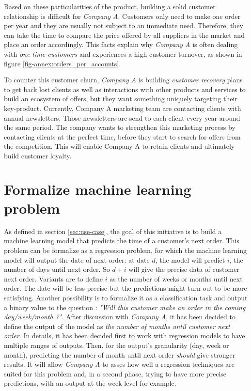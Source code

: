  Based on these particularities of the product, building a solid customer relationship is difficult for \textit{Company A}. Customers only need to make one order per year and they are usually not subject to an immediate need. Therefore, they can take the time to compare the price offered by all suppliers in the market and place an order accordingly. This facts explain why \textit{Company A} is often dealing with \textit{one-time customers} and experiences a high customer turnover, as shown in figure \ref{fig-annex:orders_per_accounts}.
 
 
 To counter this customer churn, \textit{Company A} is building \textit{customer recovery} plans to get back lost clients as well as interactions with other products and services to build an ecosystem of offers, but they want something uniquely targeting their key-product. Currently, Company A marketing team are contacting clients with annual newsletters. Those newsletters are send to each client every year around the same period. The company wants to strengthen this marketing process by contacting clients at the perfect time, before they start to search for offers from the competition. This will enable Company A to retain clients and ultimately build customer loyalty.
 
 
\section{Formalize machine learning problem} \label{sec:ml-metrics}

As defined in section \ref{sec:use-case}, the goal of this initiative is to build a machine learning model that predicts the time of a customer's next order. This problem can be formalize as a regression problem, for which the machine learning model will output the date of next order: at date $d$, the model will predict $i$, the number of days until next order. So $d+i$ will give the precise data of customer next order. Variants are to define $i$ as the number of weeks or months until next order. The date will be less precise but the predictions might turn out to be more satisfying. Another possibility is to formalize it as a classification task and output a binary value to the question : \textit{"Will this customer make an order in the coming day/week/month ?"}. After discussion with \textit{Company A}, it has been decided to define the output of the model as \textit{the number of months until customer next order}. In details, it has been decided first to work with regression models to have multiple ranges of outputs. Then, for the output's granularity (day, week or month), predicting the number of month until next order \textit{should} give stronger results. It will allow \textit{Company A} to asses how well a regression techniques are suited for this problem and, in a second phase, trying to have more precise predictions, with an output at the week level for example.

